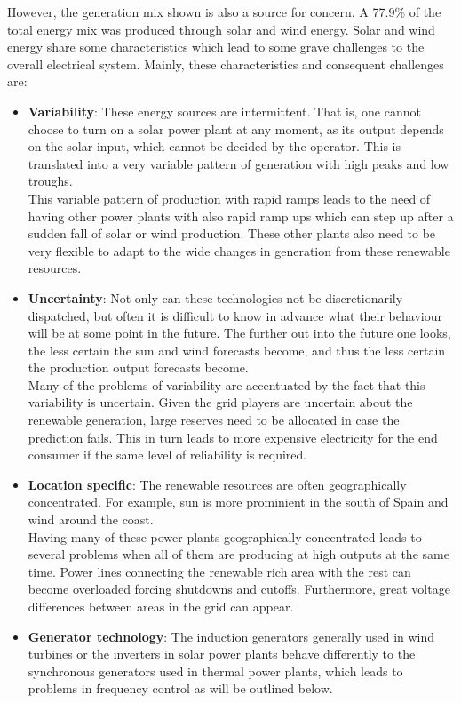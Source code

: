However, the generation mix shown is also a source for concern. A 77.9\% of the total energy mix was produced through solar and wind energy. Solar and wind energy share some characteristics which lead to some grave challenges to the overall electrical system. Mainly, these characteristics and consequent challenges are:
\begin{itemize}
    \item \textbf{Variability}: These energy sources are intermittent. That is, one cannot choose to turn on a solar power plant at any moment, as its output depends on the solar input, which cannot be decided by the operator. This is translated into a very variable pattern of generation with high peaks and low troughs. 
    \\This variable pattern of production with rapid ramps leads to the need of having other power plants with also rapid ramp ups which can step up after a sudden fall of solar or wind production. These other plants also need to be very flexible to adapt to the wide changes in generation from these renewable resources.
    \item \textbf{Uncertainty}: Not only can these technologies not be discretionarily dispatched, but often it is difficult to know in advance what their behaviour will be at some point in the future. The further out into the future one looks, the less certain the sun and wind forecasts become, and thus the less certain the production output forecasts become.
    \\Many of the problems of variability are accentuated by the fact that this variability is uncertain. Given the grid players are uncertain about the renewable generation, large reserves need to be allocated in case the prediction fails. This in turn leads to more expensive electricity for the end consumer if the same level of reliability is required. 
    \item \textbf{Location specific}: The renewable resources are often geographically concentrated. For example, sun is more prominient in the south of Spain and wind around the coast. 
    \\Having many of these power plants geographically concentrated leads to several problems when all of them are producing at high outputs at the same time. Power lines connecting the renewable rich area with the rest can become overloaded forcing shutdowns and cutoffs. Furthermore, great voltage differences between areas in the grid can appear.
    \item \textbf{Generator technology}: The induction generators generally used in wind turbines or the inverters in solar power plants behave differently to the synchronous generators used in thermal power plants, which leads to problems in frequency control as will be outlined below. 

\end{itemize}
